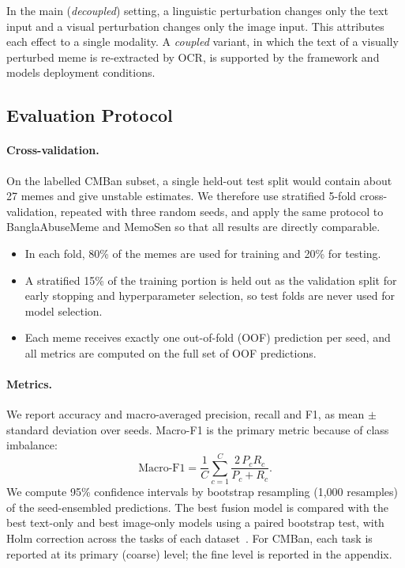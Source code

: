 In the main (\emph{decoupled}) setting, a linguistic perturbation changes only the text input and a visual
perturbation changes only the image input. This attributes each effect to a single modality. A \emph{coupled}
variant, in which the text of a visually perturbed meme is re-extracted by OCR, is supported by the framework and
models deployment conditions.

\subsection{Evaluation Protocol}
\label{sec:method:eval}

\paragraph{Cross-validation.}
On the labelled CMBan subset, a single held-out test split would contain about 27 memes and give unstable estimates.
We therefore use stratified 5-fold cross-validation, repeated with three random seeds, and apply the same protocol
to BanglaAbuseMeme and MemoSen so that all results are directly comparable.
\begin{itemize}
  \item In each fold, 80\% of the memes are used for training and 20\% for testing.
  \item A stratified 15\% of the training portion is held out as the validation split for early stopping and
  hyperparameter selection, so test folds are never used for model selection.
  \item Each meme receives exactly one out-of-fold (OOF) prediction per seed, and all metrics are computed on the
  full set of OOF predictions.
\end{itemize}

\paragraph{Metrics.}
We report accuracy and macro-averaged precision, recall and F1, as mean $\pm$ standard deviation over seeds. Macro-F1
is the primary metric because of class imbalance:
\begin{equation}
\text{Macro-F1}=\frac{1}{C}\sum_{c=1}^{C}\frac{2\,P_c R_c}{P_c+R_c}.
\end{equation}
We compute 95\% confidence intervals by bootstrap resampling (1{,}000 resamples) of the seed-ensembled predictions.
The best fusion model is compared with the best text-only and best image-only models using a paired bootstrap test,
with Holm correction across the tasks of each dataset~\cite{holm1979}. For CMBan, each task is reported at its
primary (coarse) level; the fine level is reported in the appendix.

